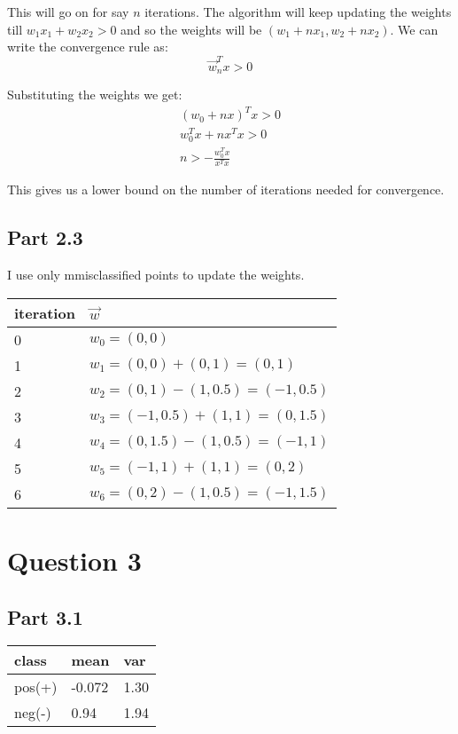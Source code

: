 \documentclass{article}
\begin{document}
\noindent This will go on for say $n$ iterations. The algorithm will keep updating the weights 
till $w_1x_1 + w_2x_2 > 0$ and so the weights will be $(w_1 + nx_1, w_2 + nx_2)$. 
We can write the convergence rule as:
$$
\vec{w}^T_nx>0
$$

\noindent Substituting the weights we get:
\begin{align*}
    (w_0 + nx)^Tx > 0\\
    w^T_0x + nx^Tx > 0\\
    n > -\frac{w^T_0x}{x^Tx}
\end{align*}

\noindent This gives us a lower bound on the number of iterations needed for convergence.
\newpage

\subsection{Part 2.3}

I use only mmisclassified points to update the weights.\\

\begin{table}[h!]
\centering
\begin{tabular}{|l|l|}
\hline
iteration & \multicolumn{1}{l|}{$\vec{w}$} \\
\hline
0 & $w_0 = (0,0)$ \\
\hline
1 & $w_1 = (0,0) + (0,1) = (0,1)$ \\
\hline
2 & $w_2 = (0,1) - (1,0.5) = (-1,0.5)$ \\
\hline
3 & $w_3 = (-1,0.5) + (1,1) = (0,1.5)$ \\
\hline
4 & $w_4 = (0,1.5) - (1,0.5) = (-1,1)$ \\
\hline
5 & $w_5 = (-1,1) + (1,1) = (0,2)$ \\
\hline
6 & $w_6 = (0,2) - (1,0.5) = (-1, 1.5)$ \\
\hline
\end{tabular}
\end{table}



\section{Question 3}

\subsection{Part 3.1}
\begin{table}[h!]
\centering
\begin{tabular}{|l|l|l|}
\hline
class & mean & var \\
\hline
pos(+) & -0.072 & 1.30 \\
\hline
neg(-) & 0.94 & 1.94 \\
\hline
\end{tabular}
\end{table}
\end{document}
